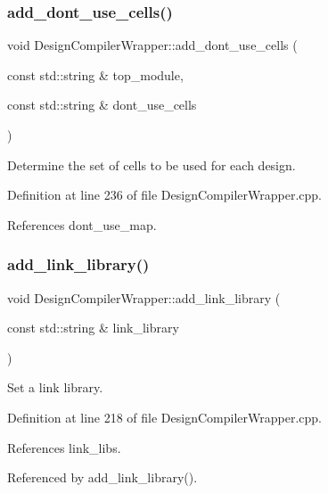 \subsubsection{\texorpdfstring{add\+\_\+dont\+\_\+use\+\_\+cells()}{add\_dont\_use\_cells()}}
{\footnotesize\ttfamily void Design\+Compiler\+Wrapper\+::add\+\_\+dont\+\_\+use\+\_\+cells (\begin{DoxyParamCaption}\item[{const std\+::string \&}]{top\+\_\+module,  }\item[{const std\+::string \&}]{dont\+\_\+use\+\_\+cells }\end{DoxyParamCaption})}



Determine the set of cells to be used for each design. 



Definition at line 236 of file Design\+Compiler\+Wrapper.\+cpp.



References dont\+\_\+use\+\_\+map.

\mbox{\label{classDesignCompilerWrapper_a4a53eb9384dba2e687b07a1d9837ebe4}} 
\subsubsection{\texorpdfstring{add\+\_\+link\+\_\+library()}{add\_link\_library()}\hspace{0.1cm}{\footnotesize\ttfamily [1/2]}}
{\footnotesize\ttfamily void Design\+Compiler\+Wrapper\+::add\+\_\+link\+\_\+library (\begin{DoxyParamCaption}\item[{const std\+::string \&}]{link\+\_\+library }\end{DoxyParamCaption})}



Set a link library. 



Definition at line 218 of file Design\+Compiler\+Wrapper.\+cpp.



References link\+\_\+libs.



Referenced by add\+\_\+link\+\_\+library().

